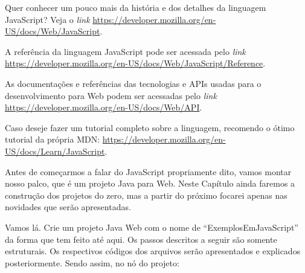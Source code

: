 \begin{saibaMais}
    Quer conhecer um pouco mais da história e dos detalhes da linguagem JavaScript? Veja o \textit{link} \url{https://developer.mozilla.org/en-US/docs/Web/JavaScript}.
\end{saibaMais}

\begin{saibaMais}
    A referência da linguagem JavaScript pode ser acessada pelo \textit{link} \url{https://developer.mozilla.org/en-US/docs/Web/JavaScript/Reference}.
\end{saibaMais}

\begin{saibaMais}
    As documentações e referências das tecnologias e APIs usadas para o desenvolvimento para Web podem ser acessadas pelo \textit{link} \url{https://developer.mozilla.org/en-US/docs/Web/API}.
\end{saibaMais}

\begin{saibaMais}
    Caso deseje fazer um tutorial completo sobre a linguagem, recomendo o ótimo tutorial da própria MDN: \url{https://developer.mozilla.org/en-US/docs/Learn/JavaScript}.
\end{saibaMais}

Antes de começarmos a falar do JavaScript propriamente dito, vamos montar nosso palco, que é um projeto Java para Web. Neste Capítulo ainda faremos a construção dos projetos do zero, mas a partir do próximo focarei apenas nas novidades que serão apresentadas.

Vamos lá. Crie um projeto Java Web com o nome de ``ExemplosEmJavaScript'' da forma que tem feito até aqui. Os passos descritos a seguir são somente estruturais. Os respectivos códigos dos arquivos serão apresentados e explicados posteriormente. Sendo assim, no nó  do projeto:

